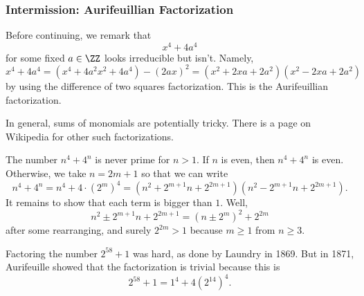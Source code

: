 \subsubsection{Intermission: Aurifeuillian Factorization}
Before continuing, we remark that
\[x^4+4a^4\]
for some fixed $a\in\ZZ$ looks irreducible but isn't. Namely,
\[x^4+4a^4=\left(x^4+4a^2x^2+4a^4\right)-(2ax)^2=\left(x^2+2xa+2a^2\right)\left(x^2-2xa+2a^2\right)\]
by using the difference of two squares factorization. This is the Aurifeuillian factorization.
\begin{remark}
	In general, sums of monomials are potentially tricky. There is a page on Wikipedia for other such factorizations.
\end{remark}
\begin{example}
	The number $n^4+4^n$ is never prime for $n>1.$ If $n$ is even, then $n^4+4^n$ is even. Otherwise, we take $n=2m+1$ so that we can write
	\[n^4+4^n=n^4+4\cdot\left(2^m\right)^4=\left(n^2+2^{m+1}n+2^{2m+1}\right)\left(n^2-2^{m+1}n+2^{2m+1}\right).\]
	It remains to show that each term is bigger than $1.$ Well,
	\[n^2\pm2^{m+1}n+2^{2m+1}=\left(n\pm2^m\right)^2+2^{2m}\]
	after some rearranging, and surely $2^{2m}>1$ because $m\ge1$ from $n\ge3.$
\end{example}
\begin{example}
	Factoring the number $2^{58}+1$ was hard, as done by Laundry in 1869. But in 1871, Aurifeuille showed that the factorization is trivial because this is
	\[2^{58}+1=1^4+4\left(2^{14}\right)^4.\]
\end{example}

